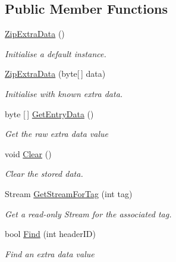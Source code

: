 \subsection*{Public Member Functions}
\begin{DoxyCompactItemize}
\item 
\hyperlink{class_i_c_sharp_code_1_1_sharp_zip_lib_1_1_zip_1_1_zip_extra_data_a16c63f6fd53ff88f18cd509fce6ba9e0}{Zip\+Extra\+Data} ()
\begin{DoxyCompactList}\small\item\em Initialise a default instance. \end{DoxyCompactList}\item 
\hyperlink{class_i_c_sharp_code_1_1_sharp_zip_lib_1_1_zip_1_1_zip_extra_data_a502553a7e72471833236dad3f46ab409}{Zip\+Extra\+Data} (byte\mbox{[}$\,$\mbox{]} data)
\begin{DoxyCompactList}\small\item\em Initialise with known extra data. \end{DoxyCompactList}\item 
byte \mbox{[}$\,$\mbox{]} \hyperlink{class_i_c_sharp_code_1_1_sharp_zip_lib_1_1_zip_1_1_zip_extra_data_a89f01603c315e957a094a40756dd1cf9}{Get\+Entry\+Data} ()
\begin{DoxyCompactList}\small\item\em Get the raw extra data value \end{DoxyCompactList}\item 
void \hyperlink{class_i_c_sharp_code_1_1_sharp_zip_lib_1_1_zip_1_1_zip_extra_data_a3ef708be128a41a9dafd3a6b8c372a94}{Clear} ()
\begin{DoxyCompactList}\small\item\em Clear the stored data. \end{DoxyCompactList}\item 
Stream \hyperlink{class_i_c_sharp_code_1_1_sharp_zip_lib_1_1_zip_1_1_zip_extra_data_a511506164310e864f98bea4223737d00}{Get\+Stream\+For\+Tag} (int tag)
\begin{DoxyCompactList}\small\item\em Get a read-\/only Stream for the associated tag. \end{DoxyCompactList}\item 
bool \hyperlink{class_i_c_sharp_code_1_1_sharp_zip_lib_1_1_zip_1_1_zip_extra_data_a91e0c6c1d11967653256ccb161f9818c}{Find} (int header\+ID)
\begin{DoxyCompactList}\small\item\em Find an extra data value \end{DoxyCompactList}\item 

\end{DoxyCompactItemize}
